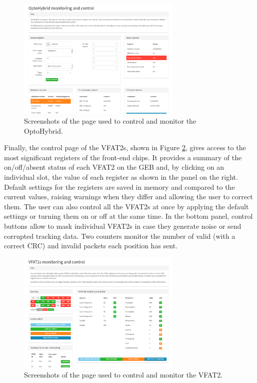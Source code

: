       \begin{figure}[h!]
        \centering
        \includegraphics[width=0.7\textwidth]{img/II-3-test-beam/app-oh.png}
        \caption{Screenshots of the page used to control and monitor the OptoHybrid.}
        \label{fig:II-3-app-oh}
      \end{figure}

      Finally, the control page of the VFAT2s, shown in Figure \ref{fig:II-3-app-vfat2}, gives access to the most significant registers of the front-end chips. It provides a summary of the on/off/absent status of each VFAT2 on the GEB and, by clicking on an individual slot, the value of each register as shown in the panel on the right. Default settings for the registers are saved in memory and compared to the current values, raising warnings when they differ and allowing the user to correct them. The user can also control all the VFAT2s at once by applying the default settings or turning them on or off at the same time. In the bottom panel, control buttons allow to mask individual VFAT2s in case they generate noise or send corrupted tracking data. Two counters monitor the number of valid (with a correct CRC) and invalid packets each position has sent.

      \begin{figure}[h!]
        \centering
        \includegraphics[width=0.7\textwidth]{img/II-3-test-beam/app-vfat2.png}
        \caption{Screenshots of the page used to control and monitor the VFAT2.}
        \label{fig:II-3-app-vfat2}
      \end{figure}

